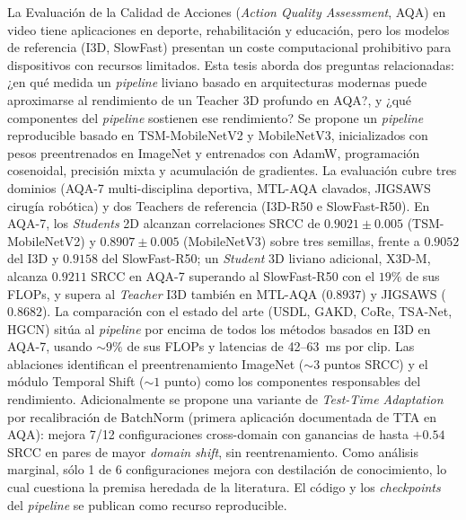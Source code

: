 \begin{resumen}
La Evaluación de la Calidad de Acciones (\textit{Action Quality Assessment}, AQA) en video tiene aplicaciones en deporte, rehabilitación y educación, pero los modelos de referencia (I3D, SlowFast) presentan un coste computacional prohibitivo para dispositivos con recursos limitados. Esta tesis aborda dos preguntas relacionadas: ¿en qué medida un \textit{pipeline} liviano basado en arquitecturas modernas puede aproximarse al rendimiento de un Teacher 3D profundo en AQA?, y ¿qué componentes del \textit{pipeline} sostienen ese rendimiento? Se propone un \textit{pipeline} reproducible basado en TSM-MobileNetV2 y MobileNetV3, inicializados con pesos preentrenados en ImageNet y entrenados con AdamW, programación cosenoidal, precisión mixta y acumulación de gradientes. La evaluación cubre tres dominios (AQA-7 multi-disciplina deportiva, MTL-AQA clavados, JIGSAWS cirugía robótica) y dos Teachers de referencia (I3D-R50 e SlowFast-R50). En AQA-7, los \textit{Students} 2D alcanzan correlaciones SRCC de $0.9021 \pm 0.005$ (TSM-MobileNetV2) y $0.8907 \pm 0.005$ (MobileNetV3) sobre tres semillas, frente a $0.9052$ del I3D y $0.9158$ del SlowFast-R50; un \textit{Student} 3D liviano adicional, X3D-M, alcanza $0.9211$ SRCC en AQA-7 superando al SlowFast-R50 con el $19\%$ de sus FLOPs, y supera al \textit{Teacher} I3D también en MTL-AQA ($0.8937$) y JIGSAWS ($0.8682$). La comparación con el estado del arte (USDL, GAKD, CoRe, TSA-Net, HGCN) sitúa al \textit{pipeline} por encima de todos los métodos basados en I3D en AQA-7, usando $\sim 9\%$ de sus FLOPs y latencias de 42--63~ms por clip. Las ablaciones identifican el preentrenamiento ImageNet ($\sim 3$ puntos SRCC) y el módulo Temporal Shift ($\sim 1$ punto) como los componentes responsables del rendimiento. Adicionalmente se propone una variante de \textit{Test-Time Adaptation} por recalibración de BatchNorm (primera aplicación documentada de TTA en AQA): mejora 7/12 configuraciones cross-domain con ganancias de hasta $+0.54$ SRCC en pares de mayor \textit{domain shift}, sin reentrenamiento. Como análisis marginal, sólo 1 de 6 configuraciones mejora con destilación de conocimiento, lo cual cuestiona la premisa heredada de la literatura. El código y los \textit{checkpoints} del \textit{pipeline} se publican como recurso reproducible.
\end{resumen}
